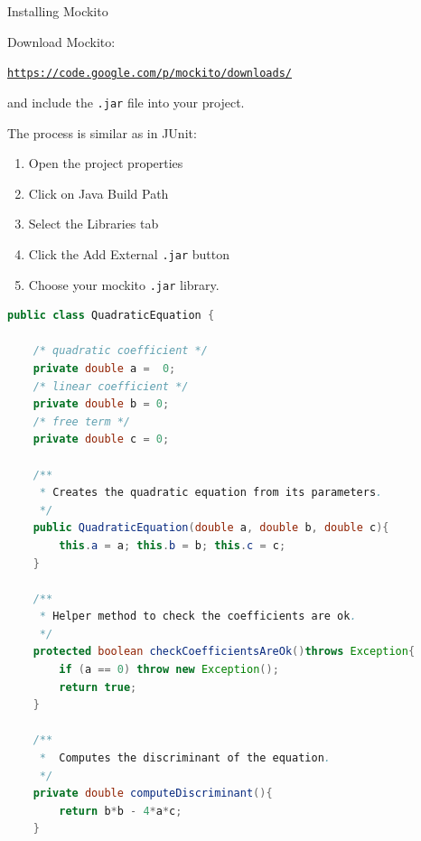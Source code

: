 \documentclass[11pt, xcolor=svgnames]{beamer}
\begin{document}


\begin{frame}{Installing Mockito}

Download Mockito:

\texttt{\url{https://code.google.com/p/mockito/downloads/}}

and include the \texttt{.jar} file into your project.

\end{frame}


\begin{frame}

The process is similar as in JUnit:
\begin{enumerate}
 \item Open the project properties
 \item Click on Java Build Path
 \item Select the Libraries tab
 \item Click the Add External \texttt{.jar} button
 \item Choose your mockito \texttt{.jar} library.
\end{enumerate}

\end{frame}




\begin{frame}[fragile]

\begin{lstlisting}[language=Java,basicstyle=\tiny]
public class QuadraticEquation {

    /* quadratic coefficient */
    private double a =  0;
    /* linear coefficient */
    private double b = 0;
    /* free term */
    private double c = 0;

    /**
     * Creates the quadratic equation from its parameters.
     */
    public QuadraticEquation(double a, double b, double c){
        this.a = a; this.b = b; this.c = c;
    }

    /**
     * Helper method to check the coefficients are ok.
     */
    protected boolean checkCoefficientsAreOk()throws Exception{
        if (a == 0) throw new Exception();
        return true;
    }

    /**
     *  Computes the discriminant of the equation.
     */
    private double computeDiscriminant(){
        return b*b - 4*a*c;
    }

\end{lstlisting}
\end{frame}
\end{document}
